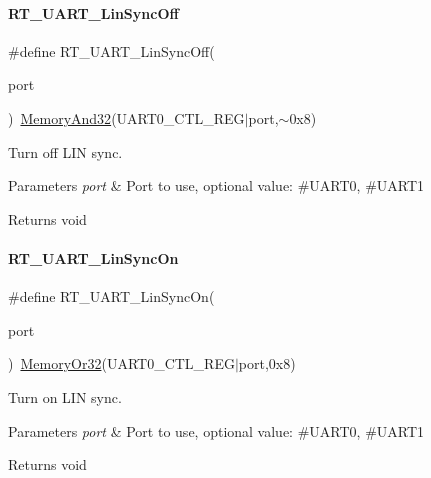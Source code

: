 \paragraph{\texorpdfstring{R\+T\+\_\+\+U\+A\+R\+T\+\_\+\+Lin\+Sync\+Off}{RT\_UART\_LinSyncOff}}
{\footnotesize\ttfamily \#define R\+T\+\_\+\+U\+A\+R\+T\+\_\+\+Lin\+Sync\+Off(\begin{DoxyParamCaption}\item[{}]{port }\end{DoxyParamCaption})~\mbox{\hyperlink{a00020_a5c1a2bd4c1bd4c2f429d8042a45327ff}{Memory\+And32}}(U\+A\+R\+T0\+\_\+\+C\+T\+L\+\_\+\+R\+EG$\vert$port,$\sim$0x8)}



Turn off L\+IN sync. 


\begin{DoxyParams}{Parameters}
{\em port} & Port to use, optional value\+: \#\+U\+A\+R\+T0, \#\+U\+A\+R\+T1 \\
\hline
\end{DoxyParams}
\begin{DoxyReturn}{Returns}
void 
\end{DoxyReturn}
\mbox{\label{a00056_a49f9d43f5fd87ceed952123010e015fa}} 
\paragraph{\texorpdfstring{R\+T\+\_\+\+U\+A\+R\+T\+\_\+\+Lin\+Sync\+On}{RT\_UART\_LinSyncOn}}
{\footnotesize\ttfamily \#define R\+T\+\_\+\+U\+A\+R\+T\+\_\+\+Lin\+Sync\+On(\begin{DoxyParamCaption}\item[{}]{port }\end{DoxyParamCaption})~\mbox{\hyperlink{a00020_a9ea92ebccdef6bdaca4d00210cc7266d}{Memory\+Or32}}(U\+A\+R\+T0\+\_\+\+C\+T\+L\+\_\+\+R\+EG$\vert$port,0x8)}



Turn on L\+IN sync. 


\begin{DoxyParams}{Parameters}
{\em port} & Port to use, optional value\+: \#\+U\+A\+R\+T0, \#\+U\+A\+R\+T1 \\
\hline
\end{DoxyParams}
\begin{DoxyReturn}{Returns}
void 
\end{DoxyReturn}
\mbox{\label{a00056_a60de547d761052a56b69e4a75493b831}} 
